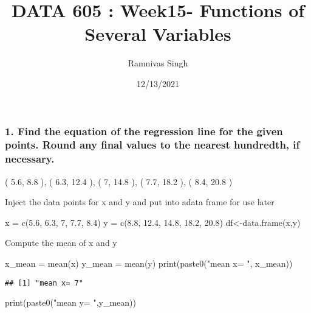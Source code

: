 \documentclass[
]{article}
\title{DATA 605 : Week15- Functions of Several Variables}
\author{Ramnivas Singh}
\date{12/13/2021}
\newenvironment{Shaded}{\begin{snugshade}}{\end{snugshade}}
\newcommand{\DecValTok}[1]{\textcolor[rgb]{0.00,0.00,0.81}{#1}}
\newcommand{\FloatTok}[1]{\textcolor[rgb]{0.00,0.00,0.81}{#1}}
\newcommand{\FunctionTok}[1]{\textcolor[rgb]{0.00,0.00,0.00}{#1}}
\newcommand{\NormalTok}[1]{#1}
\newcommand{\OtherTok}[1]{\textcolor[rgb]{0.56,0.35,0.01}{#1}}
\newcommand{\StringTok}[1]{\textcolor[rgb]{0.31,0.60,0.02}{#1}}
\begin{document}
\maketitle

\hypertarget{find-the-equation-of-the-regression-line-for-the-given-points.-round-any-final-values-to-the-nearest-hundredth-if-necessary.}{%
\subsubsection{1. Find the equation of the regression line for the given
points. Round any final values to the nearest hundredth, if
necessary.}\label{find-the-equation-of-the-regression-line-for-the-given-points.-round-any-final-values-to-the-nearest-hundredth-if-necessary.}}

( 5.6, 8.8 ), ( 6.3, 12.4 ), ( 7, 14.8 ), ( 7.7, 18.2 ), ( 8.4, 20.8 )

Inject the data points for x and y and put into adata frame for use
later

\begin{Shaded}
\begin{Highlighting}[]
\NormalTok{x }\OtherTok{=} \FunctionTok{c}\NormalTok{(}\FloatTok{5.6}\NormalTok{, }\FloatTok{6.3}\NormalTok{, }\DecValTok{7}\NormalTok{, }\FloatTok{7.7}\NormalTok{, }\FloatTok{8.4}\NormalTok{)}
\NormalTok{y }\OtherTok{=} \FunctionTok{c}\NormalTok{(}\FloatTok{8.8}\NormalTok{, }\FloatTok{12.4}\NormalTok{, }\FloatTok{14.8}\NormalTok{, }\FloatTok{18.2}\NormalTok{, }\FloatTok{20.8}\NormalTok{)}
\NormalTok{df}\OtherTok{\textless{}{-}}\FunctionTok{data.frame}\NormalTok{(x,y)}
\end{Highlighting}
\end{Shaded}

Compute the mean of x and y

\begin{Shaded}
\begin{Highlighting}[]
\NormalTok{x\_mean }\OtherTok{=} \FunctionTok{mean}\NormalTok{(x)}
\NormalTok{y\_mean }\OtherTok{=} \FunctionTok{mean}\NormalTok{(y)}
\FunctionTok{print}\NormalTok{(}\FunctionTok{paste0}\NormalTok{(}\StringTok{"mean x= "}\NormalTok{, x\_mean))}
\end{Highlighting}
\end{Shaded}

\begin{verbatim}
## [1] "mean x= 7"
\end{verbatim}

\begin{Shaded}
\begin{Highlighting}[]
\FunctionTok{print}\NormalTok{(}\FunctionTok{paste0}\NormalTok{(}\StringTok{"mean y= "}\NormalTok{,y\_mean))}
\end{Highlighting}
\end{Shaded}
\end{document}
